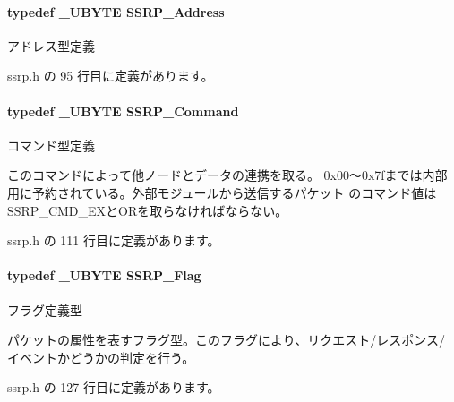 \paragraph[{S\+S\+R\+P\+\_\+\+Address}]{\setlength{\rightskip}{0pt plus 5cm}typedef {\bf \+\_\+\+U\+B\+Y\+T\+E} {\bf S\+S\+R\+P\+\_\+\+Address}}\label{ssrp_8h_af52db94d5ce59044edabda26c25f92f9_af52db94d5ce59044edabda26c25f92f9}


アドレス型定義 



 ssrp.\+h の 95 行目に定義があります。

\paragraph[{S\+S\+R\+P\+\_\+\+Command}]{\setlength{\rightskip}{0pt plus 5cm}typedef {\bf \+\_\+\+U\+B\+Y\+T\+E} {\bf S\+S\+R\+P\+\_\+\+Command}}\label{ssrp_8h_a90e773bf16f83fcbc70733b85f7ae614_a90e773bf16f83fcbc70733b85f7ae614}


コマンド型定義 

このコマンドによって他ノードとデータの連携を取る。 0x00〜0x7fまでは内部用に予約されている。外部モジュールから送信するパケット のコマンド値は\+S\+S\+R\+P\+\_\+\+C\+M\+D\+\_\+\+E\+Xと\+O\+Rを取らなければならない。 

 ssrp.\+h の 111 行目に定義があります。

\paragraph[{S\+S\+R\+P\+\_\+\+Flag}]{\setlength{\rightskip}{0pt plus 5cm}typedef {\bf \+\_\+\+U\+B\+Y\+T\+E} {\bf S\+S\+R\+P\+\_\+\+Flag}}\label{ssrp_8h_a1f7d2b0dad1935ce49334c86a67d202a_a1f7d2b0dad1935ce49334c86a67d202a}


フラグ定義型 

パケットの属性を表すフラグ型。このフラグにより、リクエスト/レスポンス/ イベントかどうかの判定を行う。 

 ssrp.\+h の 127 行目に定義があります。


